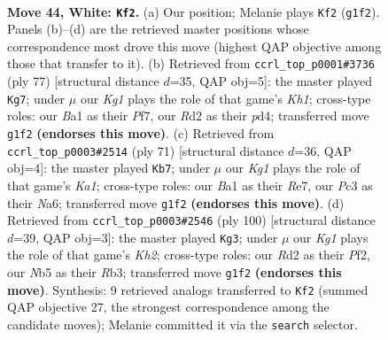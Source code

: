 \documentclass[11pt]{article}
\begin{document}
\clearpage

\begin{figure}[p]\centering
\begin{subfigure}{0.46\textwidth}\centering
\resizebox{\linewidth}{!}{%
\newchessgame
\chessboard[
  setfen={8/1p2pk1p/n5p1/pNp5/7r/2P2P2/P2R4/B5K1 w - - 0 44},
  showmover=false,
  pgfstyle=straightmove, color=movearrow, markmove={g1-f2}
]}
\caption{}
\end{subfigure}\hfill
\begin{subfigure}{0.46\textwidth}\centering
\resizebox{\linewidth}{!}{%
\newchessgame
\chessboard[
  setfen={7k/5p2/6r1/3pP1p1/1p1P4/2n3P1/3N1PK1/R7 b - - 1 39},
  showmover=false,
  pgfstyle=straightmove, color=movearrow, markmove={h8-g7}
]}
\caption{}
\end{subfigure}
\\[4pt]
\begin{subfigure}{0.46\textwidth}\centering
\resizebox{\linewidth}{!}{%
\newchessgame
\chessboard[
  setfen={k5R1/4r3/n6p/p2Pp3/2P4p/2P1PP2/P3K2P/8 b - - 0 36},
  showmover=false,
  pgfstyle=straightmove, color=movearrow, markmove={a8-b7}
]}
\caption{}
\end{subfigure}\hfill
\begin{subfigure}{0.46\textwidth}\centering
\resizebox{\linewidth}{!}{%
\newchessgame
\chessboard[
  setfen={4r3/6p1/n1k1p2p/3pPp1P/3P4/1R1N4/5PPK/8 w - - 3 51},
  showmover=false,
  pgfstyle=straightmove, color=movearrow, markmove={h2-g3}
]}
\caption{}
\end{subfigure}
\caption{\textbf{Move 44, White: \texttt{Kf2}.} (a) Our position; Melanie plays \texttt{Kf2} (\texttt{g1f2}). Panels (b)--(d) are the retrieved master positions whose correspondence most drove this move (highest QAP objective among those that transfer to it). (b) Retrieved from \texttt{ccrl\_top\_p0001\#3736} (ply 77) [structural distance $d$=35, QAP obj=5]: the master played \texttt{Kg7}; under $\mu$ our \emph{Kg1} plays the role of that game's \emph{Kh1}; cross-type roles: our \emph{B}a1 as their \emph{P}f7, our \emph{R}d2 as their \emph{p}d4; transferred move \texttt{g1f2} \textbf{(endorses this move)}. (c) Retrieved from \texttt{ccrl\_top\_p0003\#2514} (ply 71) [structural distance $d$=36, QAP obj=4]: the master played \texttt{Kb7}; under $\mu$ our \emph{Kg1} plays the role of that game's \emph{Ka1}; cross-type roles: our \emph{B}a1 as their \emph{R}e7, our \emph{P}c3 as their \emph{N}a6; transferred move \texttt{g1f2} \textbf{(endorses this move)}. (d) Retrieved from \texttt{ccrl\_top\_p0003\#2546} (ply 100) [structural distance $d$=39, QAP obj=3]: the master played \texttt{Kg3}; under $\mu$ our \emph{Kg1} plays the role of that game's \emph{Kh2}; cross-type roles: our \emph{R}d2 as their \emph{P}f2, our \emph{N}b5 as their \emph{R}b3; transferred move \texttt{g1f2} \textbf{(endorses this move)}. Synthesis: 9 retrieved analogs transferred to \texttt{Kf2} (summed QAP objective 27, the strongest correspondence among the candidate moves); Melanie committed it via the \texttt{search} selector.}
\label{fig:thought-m86}
\end{figure}
\end{document}
